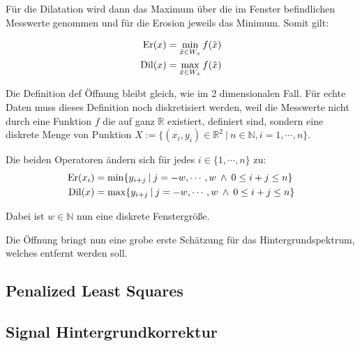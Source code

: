 \documentclass{article}
\newcommand{\R}[0]{\mathbb{R}}
\begin{document}
Für die Dilatation wird dann das Maximum über die im Fenster befindlichen Messwerte genommen und für die Erosion jeweils das Minimum. Somit gilt:

\begin{align}
    {\rm Er}(x)  &= \min\limits_{\tilde{x} \in W_x} f(\tilde{x}) \\
    {\rm Dil}(x) &= \max\limits_{\tilde{x} \in W_x} f(\tilde{x})
\end{align}

Die Definition def Öffnung bleibt gleich, wie im 2 dimensionalen Fall.
Für echte Daten muss dieses Definition noch diskretisiert werden, weil die Messwerte nicht durch eine Funktion $f$ die auf ganz $\R$ existiert, definiert sind, sondern eine diskrete Menge von Punktion $X := \{(x_i,y_i) \in \R^2 \: | \: n\in \mathbb{N}, i=1,\cdots,n \}$.

Die beiden Operatoren ändern sich für jedes $i\in \{1,\cdots,n\}$ zu:
\begin{align}
    {\rm Er}(x_i) &= \min \{y_{i+j} \: | \: j=-w,\cdots,w \: \land \: 0 \leq i + j \leq n\} \\
    {\rm Dil}(x)  &= \max \{y_{i+j} \: | \: j=-w,\cdots,w \: \land \: 0 \leq i + j \leq n\}
\end{align}

Dabei ist $w \in \mathbb{N}$ nun eine diskrete Fenstergröße.

Die Öffnung bringt nun eine grobe erste Schätzung für das Hintergrundspektrum, welches entfernt werden soll.

\subsection{Penalized Least Squares}
\subsection{Signal Hintergrundkorrektur}
\end{document}

